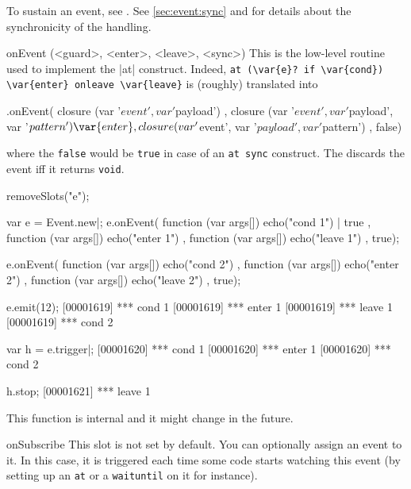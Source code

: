 \begin{urbiscriptapi}
To sustain an event, see .  See \autoref{sec:event:sync}
and  for details about the synchronicity of the handling.



\item[onEvent](<guard>, <enter>, <leave>, <sync>)%
  This is the low-level routine used to implement the \lstindex|at|
  construct.  Indeed,
  \lstinline|at (\var{e}? if \var{cond}) \var{enter} onleave \var{leave}|
  is (roughly) translated into
\begin{urbiunchecked}
  .onEvent(
    closure (var '$event', var '$payload')                 {   },
    closure (var '$event', var '$payload', var '$pattern') { \var{enter} },
    closure (var '$event', var '$payload', var '$pattern') {  },
    false)
\end{urbiunchecked}

\noindent
where the \lstinline|false| would be \lstinline|true| in case of an
\lstinline|at sync| construct.  The  discards the event iff it
returns \lstinline{void}.

\begin{urbicomment}
removeSlots("e");
\end{urbicomment}
\begin{urbiscript}
var e = Event.new|;
e.onEvent(
  function (var args[]) { echo("cond 1") | true },
  function (var args[]) { echo("enter 1") },
  function (var args[]) { echo("leave 1") },
  true);

e.onEvent(
  function (var args[]) { echo("cond 2") },
  function (var args[]) { echo("enter 2") },
  function (var args[]) { echo("leave 2") },
  true);

e.emit(12);
[00001619] *** cond 1
[00001619] *** enter 1
[00001619] *** leave 1
[00001619] *** cond 2

var h = e.trigger|;
[00001620] *** cond 1
[00001620] *** enter 1
[00001620] *** cond 2

h.stop;
[00001621] *** leave 1
\end{urbiscript}

This function is internal and it might change in the future.


\item[onSubscribe]%
  This slot is not set by default. You can optionally assign an event to
  it. In this case, it is triggered each time some code starts watching this
  event (by setting up an \lstinline|at| or a \lstinline|waituntil| on it
  for instance).


\end{urbiscriptapi}
